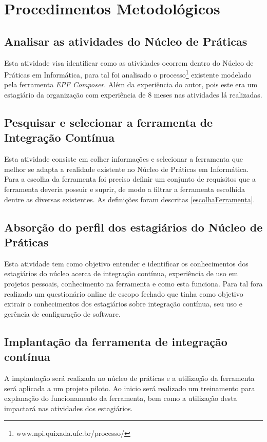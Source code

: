 \chapter{Procedimentos Metodológicos}\label{metodologia}

\section{Analisar as atividades do Núcleo de Práticas}
Esta atividade visa identificar como as atividades ocorrem dentro do Núcleo de Práticas em Informática, para tal foi analisado o processo\footnote{www.npi.quixada.ufc.br/processo/} existente modelado pela ferramenta \textit{EPF Composer}. Além da experiência do autor, pois este era um estagiário da organização com experiência de 8 meses nas atividades lá realizadas. 

\section{Pesquisar e selecionar a ferramenta de Integração Contínua}

Esta atividade consiste em  colher informações e selecionar a ferramenta que melhor se adapta a realidade existente no Núcleo de Práticas em Informática. 
Para a escolha da ferramenta foi preciso definir um conjunto de requisitos que a ferramenta deveria possuir e suprir, de modo a filtrar a ferramenta escolhida dentre as diversas existentes. As definições foram descritas \autoref{escolhaFerramenta}. 

\section{Absorção do perfil dos estagiários do Núcleo de Práticas}
Esta atividade tem como objetivo entender e identificar os conhecimentos dos estagiários do núcleo acerca de integração contínua, experiência de uso em projetos pessoais, conhecimento na ferramenta e como esta funciona. Para tal fora realizado um questionário online de escopo fechado que tinha como objetivo extrair o conhecimentos dos estagiários sobre integração contínua, seu uso e gerência de configuração de software.

\section{Implantação da ferramenta de integração contínua}
A implantação será realizada no núcleo de práticas e a utilização da ferramenta será aplicada a um projeto piloto. Ao inicio será realizado um treinamento para explanação do funcionamento da ferramenta, bem como a utilização desta impactará nas atividades dos estagiários.

